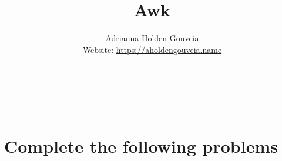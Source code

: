 \documentclass[12pt]{article}
\title{Awk}
\author{
        Adrianna Holden-Gouveia \\
        Website: \url{https://aholdengouveia.name}\\ 
        \date{\vspace{-5ex}}
        \faLinkedin{: aholdengouveia} \\
        \faGithub {: aholdengouveia} \\
        \faTwitter {: aholdengouveia} \\
        }
\begin{document}
    

\maketitle

\section*{Complete the following problems}
\end{document}
